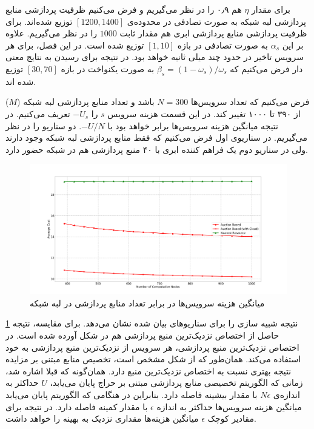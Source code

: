     برای مقدار $\eta$ هم ۰٫۹ را در نظر می‌گیریم و فرض می‌کنیم ظرفیت پردازشی منابع پردازشی لبه شبکه به صورت تصادفی در محدوده‌ی $[1200, 1400]$ توزیع شده‌اند.
    برای ظرفیت پردازشی منابع پردازشی ابری هم مقدار ثابت $1000$ را در نظر می‌گیریم.
    علاوه بر این $\alpha_s$ به صورت تصادفی در بازه $[1, 10]$ توزیع شده است.
    در این فصل، برای هر سرویس تاخیر در حدود چند میلی ثانیه خواهد بود.
    در نتیجه برای رسیدن به نتایج معنی دار فرض می‌کنیم که $\beta_s = (1-\omega_s)/\omega_s$ به صورت یکنواخت در بازه $[30,70]$ توزیع شده اند.
    
    فرض می‌کنیم که تعداد سرویس‌ها $N=300$ باشد و تعداد منابع پردازشی لبه شبکه ($M$) از ۳۹۰ تا ۱۰۰۰ تغییر کند.
    در این قسمت هزینه سرویس $s$ را $-U_s$ تعریف می‌کنیم. 
    در نتیجه میانگین هزینه سرویس‌ها برابر خواهد بود با $-U/N$.
    دو سناریو را در نظر می‌گیریم.
    در سناریو‌ی اول فرض می‌کنیم که فقط منابع پردازشی لبه شبکه وجود دارند ولی در سناریو دوم یک فراهم کننده ابری با ۴۰ منبع پردازشی هم در شبکه حضور دارد.
    
    \begin{figure}
      \centerline{\includegraphics[width=17cm]{graphics/one_to_one/sim_1}}
      \caption{میانگین هزینه سرویس‌ها در برابر تعداد منابع پردازشی در لبه شبکه}
      \label{fig:ono_to_one:sim1}
    \end{figure}

    \cref{fig:ono_to_one:sim1} نتیجه شبیه سازی را برای سناریو‌های بیان شده نشان می‌دهد.
    برای مقایسه، نتیجه حاصل از اختصاص نزدیک‌ترین منبع پردازشی هم در شکل آورده شده است.
    در اختصاص نزدیک‌ترین منبع پردازشی، هر سرویس از نزدیک‌ترین منبع پردازشی به خود استفاده می‌کند.
    همان‌طور که از شکل مشخص است، تخصیص منابع مبتنی بر مزایده نتیجه بهتری نسبت به اختصاص نزدیک‌ترین منبع دارد.
    همان‌گونه که قبلا اشاره شد، زمانی که الگوریتم تخصیصی منابع پردازشی مبتنی بر حراج پایان می‌یابد، $U$ حداکثر به اندازه‌ی $N\epsilon$ با مقدار بیشینه فاصله دارد.
    بنابراین در هنگامی که الگوریتم پایان می‌یابد میانگین هزینه سرویس‌ها حداکثر به اندازه $\epsilon$ با مقدار کمینه فاصله دارد.
    در نتیجه برای مقادیر کوچک $\epsilon$ میانگین هزینه‌ها مقداری نزدیک به بهینه را خواهد داشت.


